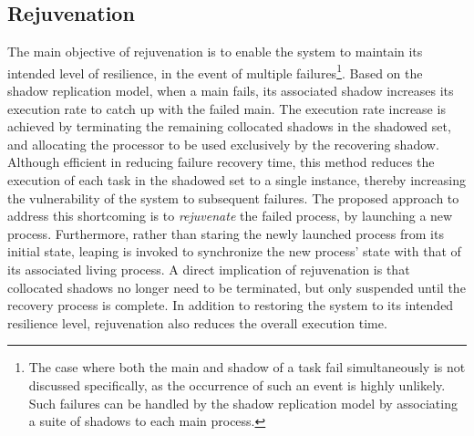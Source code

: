 \subsection{Rejuvenation}

The main objective of rejuvenation is to enable the system to maintain its intended level of resilience, in the event of multiple failures\footnote{The case where both the main and shadow of a task fail simultaneously is not discussed specifically, as the occurrence of such an event is highly unlikely. Such failures can be handled by the shadow replication model by associating a suite of shadows to each main process.}. Based on the shadow replication model, when a main fails, its associated shadow increases its execution rate to catch up with the failed main. The execution rate increase is achieved by terminating  the remaining collocated shadows in the shadowed set, and allocating the processor to be used exclusively by the recovering shadow. Although efficient in reducing failure recovery time, this method reduces the execution of each task in the shadowed set to a single instance, thereby increasing the vulnerability of the system to subsequent failures. 
The proposed approach to address this shortcoming is to \textit{rejuvenate} the failed process, by launching a new process. Furthermore, rather than staring the newly launched process from its initial state, leaping is invoked to  synchronize the new process' state with that of its associated living process. A direct implication of rejuvenation is that collocated shadows no longer need to be terminated, but only suspended  until the recovery process is complete.  In addition to restoring  the system to its intended resilience level, rejuvenation also reduces the overall execution time. 



